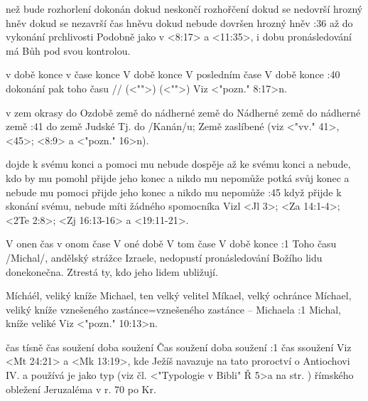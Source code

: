     

    {než bude rozhorlení dokonán}   %
    {dokud neskončí rozhořčení}   %
    {dokud se nedovrší hrozný hněv}   %
    {dokud se nezavrší čas hněvu}  %
    {dokud nebude dovršen hrozný hněv}   %
:36 {až do vykonání prchlivosti}  
    Podobně jako v <8:17> a <11:35>, i dobu pronásledování má Bůh pod svou kontrolou.


    {v době konce}   %
    {v čase konce}   %
    {V době konce}   %
    {V posledním čase}   %
    {V době konce}   %
:40 {dokonání pak toho času}  \x// (<"">) (<"">) 
    Viz <"pozn." 8:17>n.

    {v zem okrasy}   %
    {do Ozdobě země}   %
    {do nádherné země}   %
    {do Nádherné země}   %
    {do nádherné země}   %
:41 {do země Judské}
    Tj. do \x/Kanán/u;  Země zaslíbené (viz <"vv." 41>, <45>; <8:9> a <"pozn." 16>n).


    {dojde k svému konci a pomoci mu nebude}   %
    {dospěje až ke svému konci a nebude, kdo by mu pomohl}   %
    {přijde jeho konec a nikdo mu nepomůže}   %
    {potká svůj konec a nebude mu pomoci}   %
    {přijde jeho konec a nikdo mu nepomůže}   %
:45 {když přijde k skonání svému, nebude míti žádného spomocníka}  
    Vizl <Jl 3>;  <Za 14:1-4>; <2Te 2:8>;  <Zj 16:13-16> a <19:11-21>.
    
    

    {V onen čas}   %
    {v onom čase}   %
    {V oné době}   %
    {V tom čase}   %
    {V době konce}   %
:1 {Toho času} \x/Michal/, andělský strážce Izraele, nedopustí pronásledování Božího lidu donekonečna. Ztrestá ty, kdo jeho lidem ubližují. 


    {Mícháél, veliký kníže} %
    {Michael, ten velký velitel}  %
    {Míkael, velký ochránce} %
    {Míchael, veliký kníže}  %
    {vznešeného zastánce}={vznešeného zastánce -- Michaela}  %
:1 {Michal, kníže veliké} Viz <"pozn." 10:13>n.

    {čas tísně} %
    {čas soužení}  %
    {doba soužení} %
    {Čas soužení}  %
    {doba soužení}  %
:1 {čas ssoužení} 
      Viz <Mt 24:21> a <Mk 13:19>, kde Ježíš navazuje na tato proroctví o Antiochovi IV. a používá je jako typ (viz čl. <"Typologie v Bibli" Ř 5>a na str. \pg) římského obležení Jeruzaléma v r. 70 po Kr. 
      
